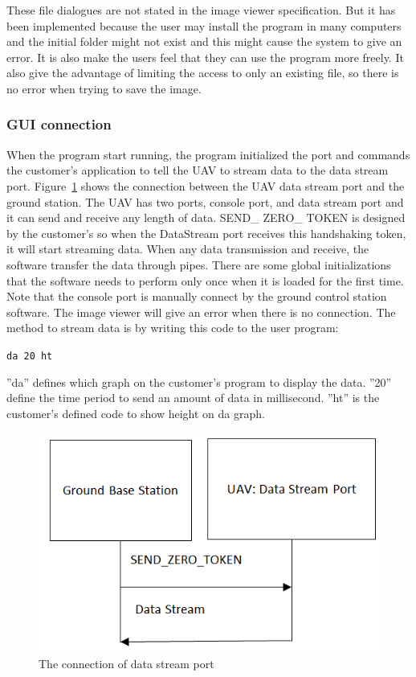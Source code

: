 \documentclass[oneside]{ecsgdp}         %
\begin{document}
These file dialogues are not stated in the image viewer specification. But it has been implemented because the user may install the program in many computers and the initial folder might not exist and this might cause the system to give an error. It is also make the users feel that they can use the program more freely.  It also give the advantage of limiting the access to only an existing file, so there is no error when trying to save the image.

\subsubsection*{GUI connection}
 When the program start running, the program initialized the port and commands the customer’s application to tell the UAV to stream data to the data stream port. Figure~\ref{GCS_connect_command} shows the connection between the UAV data stream port and the ground station. The UAV has two ports, console port, and data stream port and it can send and receive any length of data. SEND\_ ZERO\_ TOKEN is designed by the customer’s so when the DataStream port receives this handshaking token, it will start streaming data. When any data transmission and receive, the software transfer the data through pipes. There are some global initializations that the software needs to perform only once when it is loaded for the first time. Note that the console port is manually connect by the ground control station software. The image viewer will give an error when there is no connection.
 The method to stream data is by writing this code to the user program:
 
\begin{center}
\texttt{da 20 ht}
\end{center}

''da'' defines which graph on the customer's program to display the data. ''20'' define the time period to send an amount of data in millisecond. ''ht'' is the customer's defined code to show height on da graph. 



\begin{figure}[!hbtp]
\begin{center}
\includegraphics[scale=0.5]{connect_command.png} 
\end{center}
\caption{The connection of data stream port\label{GCS_connect_command}}
\end{figure}
\end{document}
